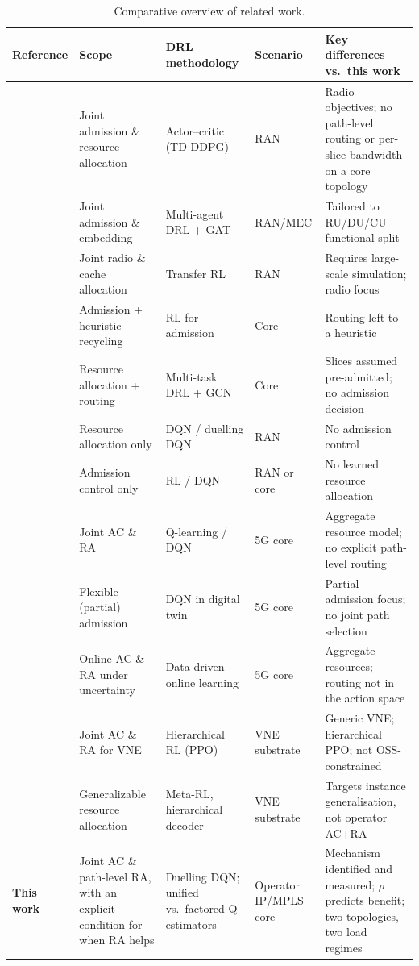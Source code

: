 \documentclass[10pt,journal,comsoc]{IEEEtran}
\begin{document}
\begin{table}[t]
\caption{Comparative overview of related work.}
\centering
\renewcommand{\arraystretch}{1.2}
\begin{tabular}{>{\raggedright\arraybackslash}m{1.8cm}
                >{\raggedright\arraybackslash}m{4.0cm}
                >{\raggedright\arraybackslash}m{2.7cm}
                >{\raggedright\arraybackslash}m{1.9cm}
                >{\raggedright\arraybackslash}m{5.4cm}}
\toprule
\textbf{Reference} & \textbf{Scope} & \textbf{DRL methodology} & \textbf{Scenario} & \textbf{Key differences vs.\ this work} \\
\midrule
\cite{Rezazadeh2021ZerotouchCN,9322237} & Joint admission \& resource allocation & Actor--critic (TD-DDPG) & RAN & Radio objectives; no path-level routing or per-slice bandwidth on a core topology \\
\cite{9953137} & Joint admission \& embedding & Multi-agent DRL + GAT & RAN/MEC & Tailored to RU/DU/CU functional split \\
\cite{zhou2022learning} & Joint radio \& cache allocation & Transfer RL & RAN & Requires large-scale simulation; radio focus \\
\cite{li2023reinforcement} & Admission + heuristic recycling & RL for admission & Core & Routing left to a heuristic \\
\cite{9655323} & Resource allocation + routing & Multi-task DRL + GCN & Core & Slices assumed pre-admitted; no admission decision \\
\cite{kim2019reinforcement,van2019optimal,abiko2020flexible} & Resource allocation only & DQN / duelling DQN & RAN & No admission control \\
\cite{sciancalepore2019rl,10293471,9771643,Tao_2025} & Admission control only & RL / DQN & RAN or core & No learned resource allocation \\
\cite{villota2022admission} & Joint AC \& RA & Q-learning / DQN & 5G core & Aggregate resource model; no explicit path-level routing \\
\cite{wang2024fsac} & Flexible (partial) admission & DQN in digital twin & 5G core & Partial-admission focus; no joint path selection \\
\cite{sulaiman2025datadriven} & Online AC \& RA under uncertainty & Data-driven online learning & 5G core & Aggregate resources; routing not in the action space \\
\cite{xiong2024hrlacra} & Joint AC \& RA for VNE & Hierarchical RL (PPO) & VNE substrate & Generic VNE; hierarchical PPO; not OSS-constrained \\
\cite{wang2024flagvne} & Generalizable resource allocation & Meta-RL, hierarchical decoder & VNE substrate & Targets instance generalisation, not operator AC+RA \\
\midrule
\textbf{This work} & Joint AC \& path-level RA, with an explicit condition for when RA helps & Duelling DQN; unified vs.\ factored Q-estimators & Operator IP/MPLS core & Mechanism identified and measured; $\rho$ predicts benefit; two topologies, two load regimes \\
\bottomrule
\end{tabular}
\label{tab:related_work_comparison}
\end{table}
\end{document}

